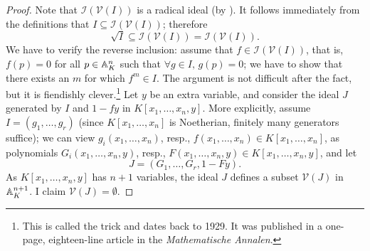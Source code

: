 \begin{proof}
  Note that $\mathcal{I}(\mathcal{V}(I))$ is a radical ideal (by
  ). It follows immediately from the definitions
  that $I \subseteq \mathcal{I}(\mathcal{V}(I))$; therefore
  \[
    \sqrt{I} \subseteq \mathcal{I}(\mathcal{V}(I)) =
    \mathcal{I}(\mathcal{V}(I)).
  \]
  We have to verify the reverse inclusion: assume that
  $f \in \mathcal{I}(\mathcal{V}(I))$, that is, $f(p) = 0$ for all
  $p \in \mathbb{A}^n_K$ such that $\forall g \in I,\, g(p) = 0$; we have to
  show that there exists an $m$ for which $f^m \in I$.  The argument
  is not difficult after the fact, but it is fiendishly
  clever.\footnote{This is called the  trick and
    dates back to 1929. It was published in a one-page, eighteen-line
    article in the \textit{Mathematische Annalen}.} Let $y$ be an
  extra variable, and consider the ideal $J$ generated by $I$ and
  $1 - fy$ in $K[x_1, \dots, x_n, y]$. More explicitly, assume
  $I = (g_1, \dots, g_r)$ (since $K[x_1, \dots, x_n]$ is Noetherian,
  finitely many generators suffice); we can view
  $g_i(x_1, \dots, x_n)$, resp.,
  $f(x_1, \dots, x_n) \in K[x_1, \dots, x_n]$, as polynomials
  $G_i(x_1, \dots, x_n, y)$, resp.,
  $F(x_1, \dots, x_n, y) \in K[x_1, \dots, x_n, y]$, and let
  \[
    J = (G_1, \dots, G_r, 1 - Fy).
  \]
  As $K[x_1, \dots, x_n, y]$ has $n+1$ variables, the ideal $J$
  defines a subset $\mathcal{V}(J)$ in $\mathbb{A}^{n+1}_K$. I claim
  $\mathcal{V}(J) = \emptyset$.


\end{proof}

